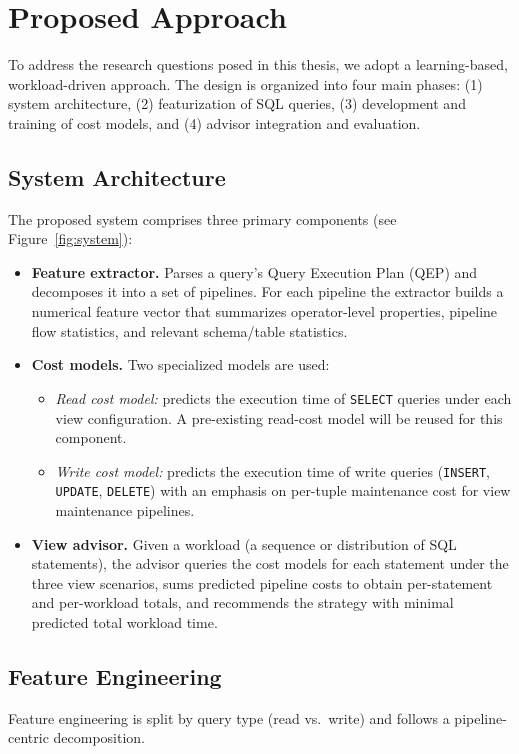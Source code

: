 \section{Proposed Approach}
\label{sec:proposed_approach}
To address the research questions posed in this thesis, we adopt a learning-based, workload-driven approach. The design is organized into four main phases: (1) system architecture, (2) featurization of SQL queries, (3) development and training of cost models, and (4) advisor integration and evaluation.

\subsection{System Architecture}
\label{sec:system_architecture}
The proposed system comprises three primary components (see Figure~\ref{fig:system}):

\begin{itemize}
    \item \textbf{Feature extractor.} Parses a query's Query Execution Plan (QEP) and decomposes it into a set of pipelines. For each pipeline the extractor builds a numerical feature vector that summarizes operator-level properties, pipeline flow statistics, and relevant schema/table statistics.
    \item \textbf{Cost models.} Two specialized models are used:
    \begin{itemize}
        \item \emph{Read cost model:} predicts the execution time of \texttt{SELECT} queries under each view configuration. A pre-existing read-cost model will be reused for this component.
        \item \emph{Write cost model:} predicts the execution time of write queries (\texttt{INSERT}, \texttt{UPDATE}, \texttt{DELETE}) with an emphasis on per-tuple maintenance cost for view maintenance pipelines.
    \end{itemize}
    \item \textbf{View advisor.} Given a workload (a sequence or distribution of SQL statements), the advisor queries the cost models for each statement under the three view scenarios, sums predicted pipeline costs to obtain per-statement and per-workload totals, and recommends the strategy with minimal predicted total workload time.
\end{itemize}

\subsection{Feature Engineering}
\label{sec:feature_engineering}
Feature engineering is split by query type (read vs.\ write) and follows a pipeline-centric decomposition.

